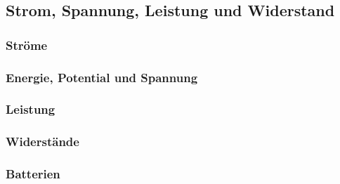 \subsection{Strom, Spannung, Leistung und Widerstand}

\subsubsection{Ströme}

\subsubsection{Energie, Potential und Spannung}

\subsubsection{Leistung}

\subsubsection{Widerstände}

\subsubsection{Batterien}